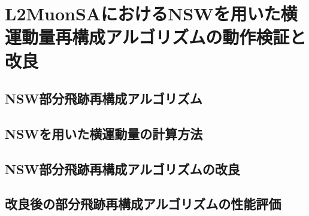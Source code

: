 \chapter{L2MuonSAにおけるNSWを用いた横運動量再構成アルゴリズムの動作検証と改良}\label{chapter4}

\section{NSW部分飛跡再構成アルゴリズム}\label{4-1}

\section{NSWを用いた横運動量の計算方法}\label{4-2}

\section{NSW部分飛跡再構成アルゴリズムの改良}\label{4-3}

\section{改良後の部分飛跡再構成アルゴリズムの性能評価}\label{4-4}